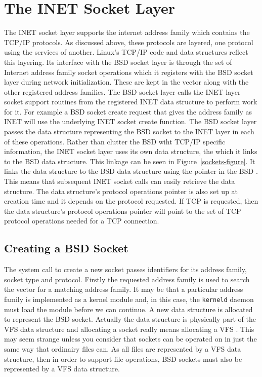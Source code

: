 \section{The INET Socket Layer}
The INET socket layer supports the internet address family which contains the TCP/IP protocols.
As discussed above, these protocols are layered, one protocol using the services of another.
Linux's TCP/IP code and data structures reflect this layering.
Its interface with the BSD socket layer is through the set of Internet address family socket operations
which it registers with the BSD socket layer during network initialization.
These are kept in the  vector along with the other registered address
families.
The BSD socket layer calls the INET layer socket support routines from the registered INET 
data structure to perform work for it.
For example a BSD socket create request that gives the address family as INET will use the underlying
INET socket create function.
The BSD socket layer passes the  data structure representing the BSD socket to the INET layer
in each of these operations.
Rather than clutter the BSD  wiht TCP/IP specific information, the INET socket layer uses
its own data structure, the  which it links to the BSD 
data structure.
This linkage can be seen in Figure~\ref{sockets-figure}.
It links the  data structure to the BSD  data structure using the  pointer
in the BSD .
This means that subsequent INET socket calls can easily retrieve the  data structure.
The  data structure's protocol operations pointer is also set up at creation time and it depends
on the  protocol requested.
If TCP is requested, then the  data structure's protocol operations pointer will point to
the set of TCP protocol operations needed for a TCP connection.

\subsection{Creating a BSD Socket}
The system call to create a new socket passes identifiers for its address family, 
socket type and protocol.
Firstly the requested address family  is used to search the  vector for a matching
address family.
It may be that a particular address family is implemented as a kernel module and, in this case,
the \texttt{kerneld} daemon must load the module before we can continue.
A new  data structure is allocated to represent the BSD socket.
Actually the  data structure is physically part of the VFS  data structure
and allocating a socket really means allocating a VFS .
This may seem strange unless you consider that sockets can be operated on in just the same way
that ordinairy files can.
As all files are represented by a VFS  data structure, then in order to support file
operations, BSD sockets must also be represented by a VFS  data structure.

